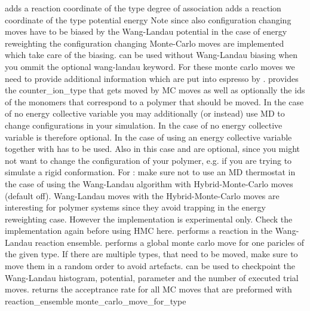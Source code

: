  adds a reaction coordinate of the type degree of association
 adds a reaction coordinate of the type potential energy
Note since also configuration changing moves have to be biased by the Wang-Landau potential in the case of energy reweighting the configuration changing Monte-Carlo moves are implemented which take care of the biasing.  can be used without Wang-Landau biasing when you ommit the optional wang-landau keyword. For these monte carlo moves we need to provide additional information which are put into espresso by .  provides the counter\_ion\_type that gets moved by MC moves as well as optionally the ids of the monomers that correspond to a polymer that should be moved. In the case of no energy collective variable you may additionally (or instead) use MD to change configurations in your simulation. In the case of no energy collective variable  is therefore optional. In the case of using an energy collective variable  together with  has to be used. Also in this case  and  are optional, since you might not want to change the configuration of your polymer, e.g. if you are trying to simulate a rigid conformation.
For : make sure not to use an MD thermostat in the case of using the Wang-Landau algorithm with Hybrid-Monte-Carlo moves (default off). Wang-Landau moves with the Hybrid-Monte-Carlo moves are interesting for polymer systems since they avoid trapping in the energy reweighting case. However the implementation is experimental only. Check the implementation again before using HMC here.  performs a reaction in the Wang-Landau reaction ensemble.
 performs a global monte carlo move for one paricles of the given type. If there are multiple types, that need to be moved, make sure to move them in a random order to avoid artefacts.
 can be used to checkpoint the Wang-Landau histogram, potential, parameter and the number of executed trial moves.
 returns the acceptrance rate for all MC moves that are preformed with reaction\_ensemble monte\_carlo\_move\_for\_type


